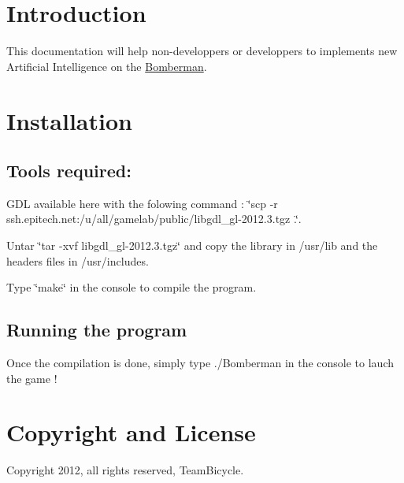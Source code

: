 \hypertarget{index_intro_sec}{}\section{Introduction}\label{index_intro_sec}
This documentation will help non-\/developpers or developpers to implements new Artificial Intelligence on the \hyperlink{namespaceBomberman}{Bomberman}.\hypertarget{index_install_sec}{}\section{Installation}\label{index_install_sec}
\hypertarget{index_tools_subsec}{}\subsection{Tools required:}\label{index_tools_subsec}
GDL available here with the folowing command : \char`\"{}scp -\/r ssh.epitech.net:/u/all/gamelab/public/libgdl\_\-gl-\/2012.3.tgz .\char`\"{}. \par
 Untar \char`\"{}tar -\/xvf libgdl\_\-gl-\/2012.3.tgz\char`\"{} and copy the library in /usr/lib and the headers files in /usr/includes. \par
 Type \char`\"{}make\char`\"{} in the console to compile the program. \par
\hypertarget{index_running}{}\subsection{Running the program}\label{index_running}
Once the compilation is done, simply type ./Bomberman in the console to lauch the game !\hypertarget{index_copyright}{}\section{Copyright and License}\label{index_copyright}
Copyright 2012, all rights reserved, TeamBicycle.

\par
\par
 